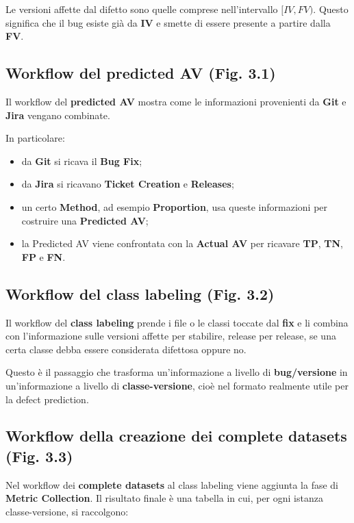 Le versioni affette dal difetto sono quelle comprese nell'intervallo \textbf{\([IV, FV)\)}. Questo significa che il bug esiste già da \textbf{IV} e smette di essere presente a partire dalla \textbf{FV}.

\subsection{Workflow del predicted AV (Fig. 3.1)}

Il workflow del \textbf{predicted AV} mostra come le informazioni provenienti da \textbf{Git} e \textbf{Jira} vengano combinate.

In particolare:

\begin{itemize}
    \item da \textbf{Git} si ricava il \textbf{Bug Fix};
    \item da \textbf{Jira} si ricavano \textbf{Ticket Creation} e \textbf{Releases};
    \item un certo \textbf{Method}, ad esempio \textbf{Proportion}, usa queste informazioni per costruire una \textbf{Predicted AV};
    \item la Predicted AV viene confrontata con la \textbf{Actual AV} per ricavare \textbf{TP}, \textbf{TN}, \textbf{FP} e \textbf{FN}.
\end{itemize}

\subsection{Workflow del class labeling (Fig. 3.2)}

Il workflow del \textbf{class labeling} prende i file o le classi toccate dal \textbf{fix} e li combina con l'informazione sulle versioni affette per stabilire, release per release, se una certa classe debba essere considerata difettosa oppure no.

Questo è il passaggio che trasforma un'informazione a livello di \textbf{bug/versione} in un'informazione a livello di \textbf{classe-versione}, cioè nel formato realmente utile per la defect prediction.

\subsection{Workflow della creazione dei complete datasets (Fig. 3.3)}

Nel workflow dei \textbf{complete datasets} al class labeling viene aggiunta la fase di \textbf{Metric Collection}. Il risultato finale è una tabella in cui, per ogni istanza classe-versione, si raccolgono:

